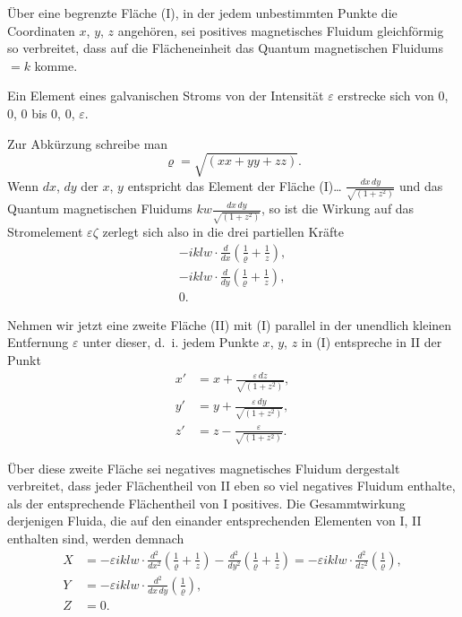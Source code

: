 \documentclass[fontsize=10pt,paper=a5,pagesize=auto]{scrbook}
\newcommand{\origpage}[1]{\marginpar{\footnotesize\textit{S. #1}}}
\begin{document}
Über eine begrenzte Fläche (I), in der jedem unbestimmten Punkte die Coordinaten $x$, $y$, $z$ angehören, sei positives magnetisches Fluidum gleichförmig so verbreitet, dass auf die Flächeneinheit das Quantum magnetischen Fluidums $= k$ komme.

Ein Element eines galvanischen Stroms von der Intensität $\varepsilon$ erstrecke sich von $0$, $0$, $0$ bis $0$, $0$, $\varepsilon$.

\origpage{630}
Zur Abkürzung schreibe man
\[
\varrho = \sqrt{(xx + yy + zz)}.
\]
Wenn $dx$, $dy$ der $x$, $y$ entspricht das Element der Fläche (I)\dots{} $\frac{dx \, dy}{\sqrt{(1 + z^2)}}$ und das Quantum magnetischen Fluidums $kw \frac{dx \, dy}{\sqrt{(1 + z^2)}}$, so ist die Wirkung auf das Stromelement $\varepsilon \zeta$ zerlegt sich also in die drei partiellen Kräfte
\begin{align*}
-iklw \cdot \frac{d}{dx}\left(\frac{1}{\varrho} + \frac{1}{z}\right),\\
-iklw \cdot \frac{d}{dy}\left(\frac{1}{\varrho} + \frac{1}{z}\right),\\
0.
\end{align*}

Nehmen wir jetzt eine zweite Fläche (II) mit (I) parallel in der unendlich kleinen Entfernung $\varepsilon$ unter dieser, d.~i. jedem Punkte $x$, $y$, $z$ in (I) entspreche in II der Punkt
\begin{align*}
x' &= x + \frac{\varepsilon \, dz}{\sqrt{(1 + z^2)}},\\
y' &= y + \frac{\varepsilon \, dy}{\sqrt{(1 + z^2)}},\\
z' &= z - \frac{\varepsilon}{\sqrt{(1 + z^2)}}.
\end{align*}

\origpage{631}
Über diese zweite Fläche sei negatives magnetisches Fluidum dergestalt verbreitet, dass jeder Flächentheil von II eben so viel negatives Fluidum enthalte, als der entsprechende Flächentheil von I positives. Die Gesammtwirkung derjenigen Fluida, die auf den einander entsprechenden Elementen von I, II enthalten sind, werden demnach
\begin{align*}
X &= -\varepsilon iklw \cdot \frac{d^2}{dx^2}\left(\frac{1}{\varrho} + \frac{1}{z}\right) - \frac{d^2}{dy^2}\left(\frac{1}{\varrho} + \frac{1}{z}\right) = -\varepsilon iklw \cdot \frac{d^2}{dz^2}\left(\frac{1}{\varrho}\right),\\
Y &= -\varepsilon iklw \cdot \frac{d^2}{dx \, dy}\left(\frac{1}{\varrho}\right),\\
Z &= 0.
\end{align*}
\end{document}
